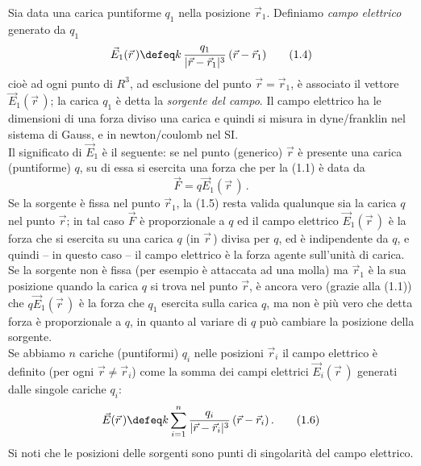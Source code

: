 Sia data una carica puntiforme $q_1$ nella posizione $\vec r_1$. Definiamo \emph{campo elettrico} generato da $q_1$
\begin{equation}
\vec E_1(\vec r\,)\defeq k\,\frac{q_1}{|\vec r-\vec r_1|^3}\,(\vec r-\vec r_1)
\tag{1.4}
\end{equation}
cioè ad ogni punto di $R^3$, ad esclusione del punto $\vec r=\vec r_1$, è associato il vettore $\vec E_1(\vec r\,)$; la carica $q_1$ è detta la \emph{sorgente del campo}. Il campo elettrico ha le dimensioni di una forza diviso una carica e quindi si misura in dyne/franklin nel sistema di Gauss, e in newton/coulomb nel SI.\\
Il significato di $\vec E_1$ è il seguente: se nel punto (generico) $\vec r$ è presente una carica (puntiforme) $q$, su di essa si esercita una forza che per la (1.1) è data da
\begin{equation}
\vec F=q\vec E_1(\vec r\,)\,.
\tag{1.5}
\end{equation}
Se la sorgente è fissa nel punto $\vec r_1$, la (1.5) resta valida qualunque sia la carica $q$ nel punto $\vec r$; in tal caso $\vec F$ è proporzionale a $q$ ed il campo elettrico $\vec E_1(\vec r\,)$ è la forza che si esercita su una carica $q$ (in $\vec r\,$) divisa per $q$, ed è indipendente da $q$, e quindi -- in questo caso -- il campo elettrico è la forza agente sull'unità di carica. Se la sorgente non è fissa (per esempio è attaccata ad una molla) ma $\vec r_1$ è la sua posizione quando la carica $q$ si trova nel punto $\vec r$, è ancora vero \big(grazie alla (1.1)\big) che $q\vec E_1(\vec r\,)$ è la forza che $q_1$ esercita sulla carica $q$, ma non è più vero che detta forza è proporzionale a $q$, in quanto al variare di $q$ può cambiare la posizione della sorgente.\\
Se abbiamo $n$ cariche (puntiformi) $q_i$ nelle posizioni $\vec r_i$ il campo elettrico è definito (per ogni $\vec r\neq\vec r_i$) come la somma dei campi elettrici $\vec E_i(\vec r\,)$ generati dalle singole cariche $q_i$:
\begin{equation}
\vec E(\vec r\,)\defeq k\sum_{i=1}^n\frac{q_i}{|\vec r-\vec r_i|^3}\,(\vec r-\vec r_i)\,.
\tag{1.6}
\end{equation}
Si noti che le posizioni delle sorgenti sono punti di singolarità del campo elettrico.\\
